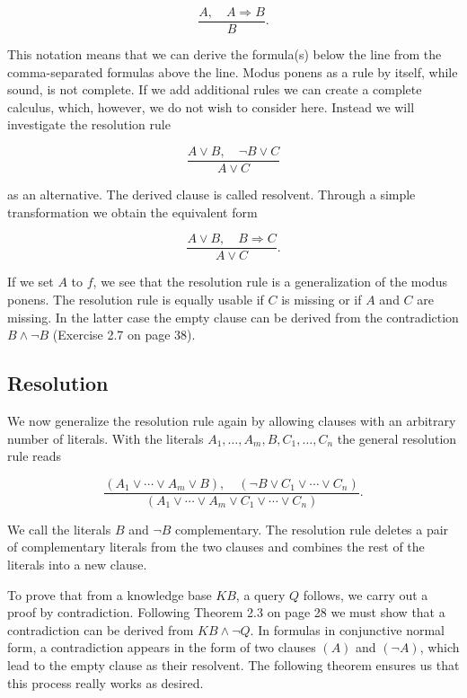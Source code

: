 \documentclass[10pt]{article}
\begin{document}
$$
\frac{A, \quad A \Rightarrow B}{B} .
$$

This notation means that we can derive the formula(s) below the line from the comma-separated formulas above the line. Modus ponens as a rule by itself, while sound, is not complete. If we add additional rules we can create a complete calculus, which, however, we do not wish to consider here. Instead we will investigate the resolution rule


\begin{equation*}
\frac{A \vee B, \quad \neg B \vee C}{A \vee C} \tag{2.1}
\end{equation*}


as an alternative. The derived clause is called resolvent. Through a simple transformation we obtain the equivalent form

$$
\frac{A \vee B, \quad B \Rightarrow C}{A \vee C} .
$$

If we set $A$ to $f$, we see that the resolution rule is a generalization of the modus ponens. The resolution rule is equally usable if $C$ is missing or if $A$ and $C$ are missing. In the latter case the empty clause can be derived from the contradiction $B \wedge \neg B$ (Exercise 2.7 on page 38).

\subsection*{Resolution}
We now generalize the resolution rule again by allowing clauses with an arbitrary number of literals. With the literals $A_{1}, \ldots, A_{m}, B, C_{1}, \ldots, C_{n}$ the general resolution rule reads


\begin{equation*}
\frac{\left(A_{1} \vee \cdots \vee A_{m} \vee B\right), \quad\left(\neg B \vee C_{1} \vee \cdots \vee C_{n}\right)}{\left(A_{1} \vee \cdots \vee A_{m} \vee C_{1} \vee \cdots \vee C_{n}\right)} . \tag{2.2}
\end{equation*}


We call the literals $B$ and $\neg B$ complementary. The resolution rule deletes a pair of complementary literals from the two clauses and combines the rest of the literals into a new clause.

To prove that from a knowledge base $K B$, a query $Q$ follows, we carry out a proof by contradiction. Following Theorem 2.3 on page 28 we must show that a contradiction can be derived from $K B \wedge \neg Q$. In formulas in conjunctive normal form, a contradiction appears in the form of two clauses $(A)$ and $(\neg A)$, which lead to the empty clause as their resolvent. The following theorem ensures us that this process really works as desired.
\end{document}

